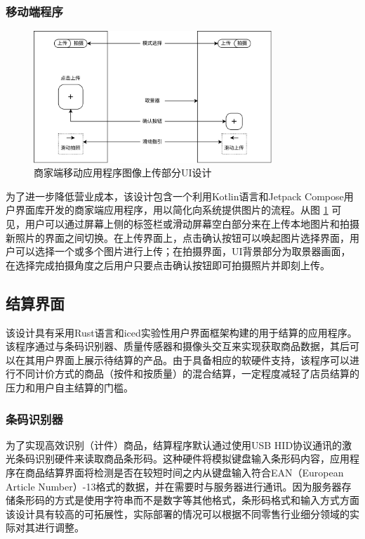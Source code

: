\subsubsection{移动端程序}

\begin{figure}[htbp]
	\centering
	\includegraphics[width=0.8\textwidth]{./imgs/se-picture.png}
	\caption{商家端移动应用程序图像上传部分UI设计}
	\label{fig:se-picture}
\end{figure}

为了进一步降低营业成本，该设计包含一个利用Kotlin语言和Jetpack Compose用户界面库开发的商家端应用程序，用以简化向系统提供图片的流程。从图 \ref{fig:se-picture} 可见，用户可以通过屏幕上侧的标签栏或滑动屏幕空白部分来在上传本地图片和拍摄新照片的界面之间切换。在上传界面上，点击确认按钮可以唤起图片选择界面，用户可以选择一个或多个图片进行上传；在拍摄界面，UI背景部分为取景器画面，在选择完成拍摄角度之后用户只要点击确认按钮即可拍摄照片并即刻上传。

\subsection{结算界面}

该设计具有采用Rust语言和iced实验性用户界面框架构建的用于结算的应用程序。该程序通过与条码识别器、质量传感器和摄像头交互来实现获取商品数据，其后可以在其用户界面上展示待结算的产品。由于具备相应的软硬件支持，该程序可以进行不同计价方式的商品（按件和按质量）的混合结算，一定程度减轻了店员结算的压力和用户自主结算的门槛。

\subsubsection{条码识别器}

为了实现高效识别（计件）商品，结算程序默认通过使用USB HID协议通讯的激光条码识别硬件来读取商品条形码。这种硬件将模拟键盘输入条形码内容，应用程序在商品结算界面将检测是否在较短时间之内从键盘输入符合EAN（European Article Number）-13格式的数据，并在需要时与服务器进行通讯。因为服务器存储条形码的方式是使用字符串而不是数字等其他格式，条形码格式和输入方式方面该设计具有较高的可拓展性，实际部署的情况可以根据不同零售行业细分领域的实际对其进行调整。

